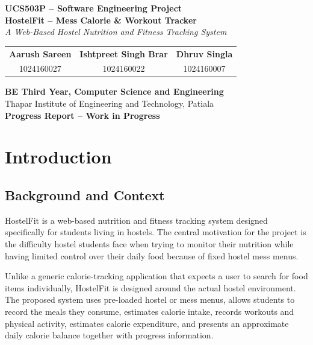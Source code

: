 \documentclass[11pt,a4paper]{article}
\begin{document}
\begin{center}
{\Large \textbf{UCS503P -- Software Engineering Project}\\[0.35cm]}
{\LARGE \textbf{HostelFit -- Mess Calorie \& Workout Tracker}\\[0.25cm]}
{\large \textit{A Web-Based Hostel Nutrition and Fitness Tracking System}\\[0.55cm]}

\begin{tabular}{ccc}
\textbf{Aarush Sareen} & \textbf{Ishtpreet Singh Brar} & \textbf{Dhruv Singla}\\
1024160027 & 1024160022 & 1024160007
\end{tabular}

\vspace{0.45cm}
\textbf{BE Third Year, Computer Science and Engineering}\\
Thapar Institute of Engineering and Technology, Patiala\\[0.2cm]
\textbf{Progress Report -- Work in Progress}
\end{center}

\tableofcontents
\clearpage

\chapter{Introduction}

\section{Background and Context}
HostelFit is a web-based nutrition and fitness tracking system designed specifically for students living in hostels. The central motivation for the project is the difficulty hostel students face when trying to monitor their nutrition while having limited control over their daily food because of fixed hostel mess menus.

Unlike a generic calorie-tracking application that expects a user to search for food items individually, HostelFit is designed around the actual hostel environment. The proposed system uses pre-loaded hostel or mess menus, allows students to record the meals they consume, estimates calorie intake, records workouts and physical activity, estimates calorie expenditure, and presents an approximate daily calorie balance together with progress information.
\end{document}
